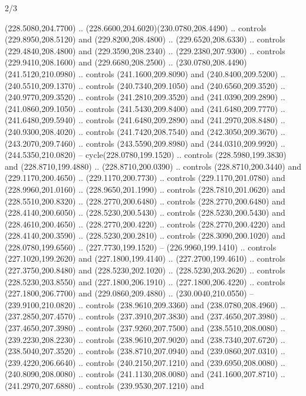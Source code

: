 \begin{flagdescription}{2/3}
\begin{scope}[xshift=0.5\flaglength,yshift=0.5\flagwidth,scale=\flagwidth/259.2]
\begin{scope}[y=0.8pt, x=0.8pt, yscale=-1,shift={(-243,-162)}]
      (228.5080,204.7700) .. (228.6600,204.6020)(230.0780,208.4490) .. controls
      (229.8950,208.5120) and (229.8200,208.4800) .. (229.6520,208.6330) .. controls
      (229.4840,208.4800) and (229.3590,208.2340) .. (229.2380,207.9300) .. controls
      (229.9410,208.1600) and (229.6680,208.2500) ..
      (230.0780,208.4490)(241.5120,210.0980) .. controls (241.1600,209.8090) and
      (240.8400,209.5200) .. (240.5510,209.1370) .. controls (240.7340,209.1050) and
      (240.6560,209.3520) .. (240.9770,209.3520) .. controls (241.2810,209.3520) and
      (241.0390,209.2890) .. (241.0860,209.1050) .. controls (241.5430,209.8400) and
      (241.6480,209.7770) .. (241.6480,209.5940) .. controls (241.6480,209.2890) and
      (241.2970,208.8480) .. (240.9300,208.4020) .. controls (241.7420,208.7540) and
      (242.3050,209.3670) .. (243.2070,209.7460) .. controls (243.5590,209.8980) and
      (244.0310,209.9920) .. (244.5350,210.0820) -- cycle(228.0780,199.1520) ..
      controls (228.5980,199.3830) and (228.8710,199.4880) .. (228.8710,200.0390) ..
      controls (228.8710,200.3440) and (229.1170,200.4650) .. (229.1170,200.7730) ..
      controls (229.1170,201.0780) and (228.9960,201.0160) .. (228.9650,201.1990) ..
      controls (228.7810,201.0620) and (228.5510,200.8320) .. (228.2770,200.6480) ..
      controls (228.2770,200.6480) and (228.4140,200.6050) .. (228.5230,200.5430) ..
      controls (228.5230,200.5430) and (228.4610,200.4650) .. (228.2770,200.4220) ..
      controls (228.2770,200.4220) and (228.4140,200.3590) .. (228.5230,200.2810) ..
      controls (228.3090,200.1020) and (228.0780,199.6560) .. (227.7730,199.1520) --
      (226.9960,199.1410) .. controls (227.1020,199.2620) and (227.1800,199.4140) ..
      (227.2700,199.4610) .. controls (227.3750,200.8480) and (228.5230,202.1020) ..
      (228.5230,203.2620) .. controls (228.5230,203.8550) and (227.1800,206.1910) ..
      (227.1800,206.4220) .. controls (227.1800,206.7700) and (229.0860,209.4880) ..
      (230.0040,210.0550) -- (239.9100,210.0820) .. controls (238.9610,209.3360) and
      (238.0780,208.4960) .. (237.2850,207.4570) .. controls (237.3910,207.3830) and
      (237.4650,207.3980) .. (237.4650,207.3980) .. controls (237.9260,207.7500) and
      (238.5510,208.0080) .. (239.2230,208.2230) .. controls (238.9610,207.9020) and
      (238.7340,207.6720) .. (238.5040,207.3520) .. controls (238.8710,207.0940) and
      (239.0860,207.0310) .. (239.4220,206.6640) .. controls (240.2150,207.1210) and
      (239.6950,208.0080) .. (240.8090,208.0080) .. controls (241.1130,208.0080) and
      (241.1600,207.8710) .. (241.2970,207.6880) .. controls (239.9530,207.1210) and

\end{scope}
\end{scope}
\end{flagdescription}
